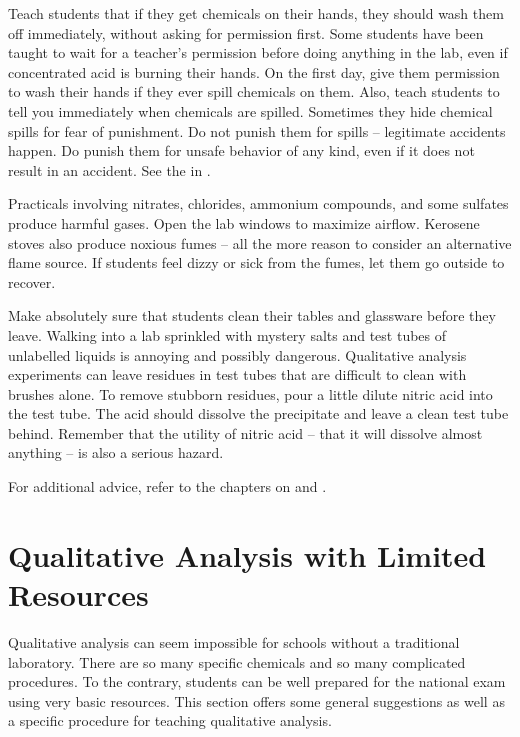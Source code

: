 Teach students that if they get chemicals on their hands, 
they should wash them off immediately, 
without asking for permission first. 
Some students have been taught to wait for a teacher's permission 
before doing anything in the lab, 
even if concentrated acid is burning their hands. 
On the first day, 
give them permission to wash their hands 
if they ever spill chemicals on them. 
Also, 
teach students to tell you immediately when chemicals are spilled. 
Sometimes they hide chemical spills for fear of punishment. 
Do not punish them for spills -- legitimate accidents happen. 
Do punish them for unsafe behavior of any kind, 
even if it does not result in an accident. 
See the  in .

Practicals involving nitrates, 
chlorides, 
ammonium compounds, 
and some sulfates produce harmful gases. 
Open the lab windows to maximize airflow. 
Kerosene stoves also produce noxious fumes -- 
all the more reason to consider an alternative flame source. 
If students feel dizzy or sick from the fumes, 
let them go outside to recover.

Make absolutely sure that students clean their tables 
and glassware before they leave. 
Walking into a lab sprinkled with mystery salts 
and test tubes of unlabelled liquids is annoying and possibly dangerous. 
Qualitative analysis experiments can leave residues in test tubes 
that are difficult to clean with brushes alone. 
To remove stubborn residues, 
pour a little dilute nitric acid into the test tube. 
The acid should dissolve the precipitate 
and leave a clean test tube behind. 
Remember that the utility of nitric acid -- 
that it will dissolve almost anything -- is also a serious hazard.

For additional advice, 
refer to the chapters on  and .

\section{Qualitative Analysis with Limited Resources}

Qualitative analysis can seem impossible for schools 
without a traditional laboratory. 
There are so many specific chemicals 
and so many complicated procedures. 
To the contrary, 
students can be well prepared for the national exam 
using very basic resources. 
This section offers some general suggestions as well as 
a specific procedure for teaching qualitative analysis.

